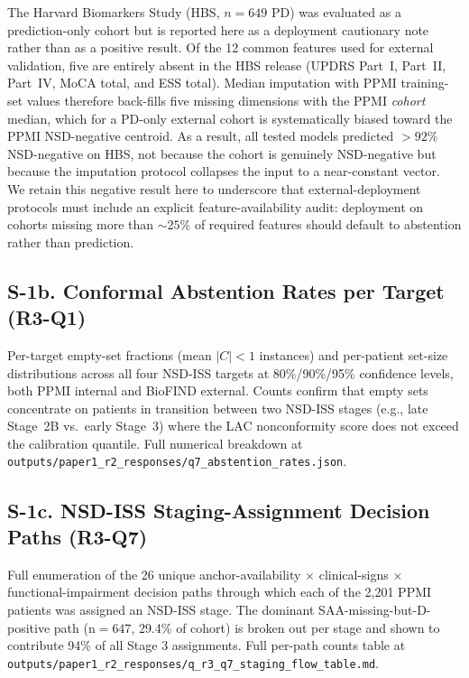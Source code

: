 The Harvard Biomarkers Study (HBS, $n{=}649$ PD) was evaluated as a prediction-only cohort but is reported here as a deployment cautionary note rather than as a positive result. Of the 12 common features used for external validation, five are entirely absent in the HBS release (UPDRS Part~I, Part~II, Part~IV, MoCA total, and ESS total). Median imputation with PPMI training-set values therefore back-fills five missing dimensions with the PPMI \emph{cohort} median, which for a PD-only external cohort is systematically biased toward the PPMI NSD-negative centroid. As a result, all tested models predicted $>92\%$ NSD-negative on HBS, not because the cohort is genuinely NSD-negative but because the imputation protocol collapses the input to a near-constant vector. We retain this negative result here to underscore that external-deployment protocols must include an explicit feature-availability audit: deployment on cohorts missing more than ${\sim}25\%$ of required features should default to abstention rather than prediction.

\subsection*{S-1b. Conformal Abstention Rates per Target (R3-Q1)}
\label{p1:sec:supp:abstention}

Per-target empty-set fractions (mean $|C|<1$ instances) and per-patient set-size distributions across all four NSD-ISS targets at 80\%/90\%/95\% confidence levels, both PPMI internal and BioFIND external. Counts confirm that empty sets concentrate on patients in transition between two NSD-ISS stages (e.g., late Stage~2B vs.\ early Stage~3) where the LAC nonconformity score does not exceed the calibration quantile. Full numerical breakdown at \texttt{outputs/paper1\_r2\_responses/q7\_abstention\_rates.json}.

\subsection*{S-1c. NSD-ISS Staging-Assignment Decision Paths (R3-Q7)}
\label{p1:sec:supp:stagingflow}

Full enumeration of the 26 unique anchor-availability $\times$ clinical-signs $\times$ functional-impairment decision paths through which each of the 2{,}201 PPMI patients was assigned an NSD-ISS stage. The dominant SAA-missing-but-D-positive path (n${=}647$, 29.4\% of cohort) is broken out per stage and shown to contribute 94\% of all Stage 3 assignments. Full per-path counts table at \texttt{outputs/paper1\_r2\_responses/q\_r3\_q7\_staging\_flow\_table.md}.

